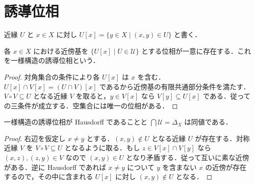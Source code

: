 \section{誘導位相}
\begin{defn}[近縁による近傍]
近縁 $U$ と $x\in X$ に対し $U[x]=\{y\in X\mid(x,y)\in U\}$ と書く．
\end{defn}
\begin{prop}[一様構造の誘導位相]
各 $x\in X$ における近傍基を $\{U[x]\mid U\in\mathcal U\}$ とする位相が一意に存在する．これを一様構造の誘導位相という．
\end{prop}
\begin{proof}
対角集合の条件により各 $U[x]$ は $x$ を含む．$U[x]\cap V[x]=(U\cap V)[x]$ であるから近傍基の有限共通部分条件を満たす．$V\circ V\subseteq U$ となる近縁 $V$ を取ると，$y\in V[x]$ なら $V[y]\subseteq U[x]$ である．従って  の三条件が成立する．空集合には唯一の位相がある．
\end{proof}
\begin{prop}[分離一様構造]
一様構造の誘導位相が Hausdorff であることと $\bigcap\mathcal U=\Delta_X$ は同値である．
\end{prop}
\begin{proof}
右辺を仮定し $x\ne y$ とする．$(x,y)\notin U$ となる近縁 $U$ が存在する．対称近縁 $V$ を $V\circ V\subseteq U$ となるように取る．もし $z\in V[x]\cap V[y]$ なら $(x,z),(z,y)\in V$ なので $(x,y)\in U$ となり矛盾する．従って互いに素な近傍がある．逆に Hausdorff であれば $x\ne y$ について $y$ を含まない $x$ の近傍が存在するので，その中に含まれる $U[x]$ に対し $(x,y)\notin U$ となる．
\end{proof}
